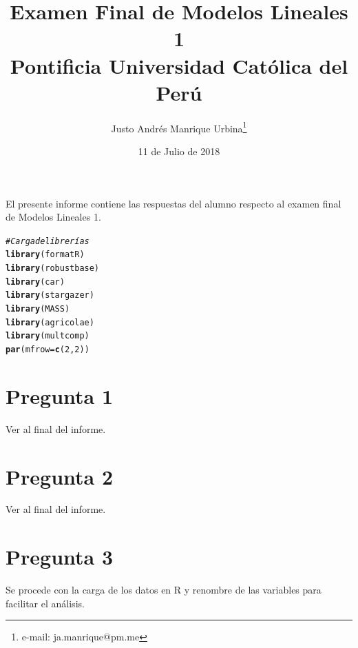 \documentclass[10pt,a4paper]{article}\usepackage[]{graphicx}\usepackage[]{color}
\title{%
			Examen Final de Modelos Lineales 1 \\
			\large Pontificia Universidad Católica del Perú}
\date{11 de Julio de 2018}
\author{Justo Andrés Manrique Urbina\footnote{e-mail: ja.manrique@pm.me}}
\makeatletter
\newcommand{\hlnum}[1]{\textcolor[rgb]{0.686,0.059,0.569}{#1}}%
\newcommand{\hlcom}[1]{\textcolor[rgb]{0.678,0.584,0.686}{\textit{#1}}}%
\newcommand{\hlstd}[1]{\textcolor[rgb]{0.345,0.345,0.345}{#1}}%
\newcommand{\hlkwc}[1]{\textcolor[rgb]{0.333,0.667,0.333}{#1}}%
\newcommand{\hlkwd}[1]{\textcolor[rgb]{0.737,0.353,0.396}{\textbf{#1}}}%
\newenvironment{kframe}{%
 \def\at@end@of@kframe{}%
 \ifinner\ifhmode%
  \def\at@end@of@kframe{\end{minipage}}%
  \begin{minipage}{\columnwidth}%
 \fi\fi%
 \def\FrameCommand##1{\hskip\@totalleftmargin \hskip-\fboxsep
 \colorbox{shadecolor}{##1}\hskip-\fboxsep
     \hskip-\linewidth \hskip-\@totalleftmargin \hskip\columnwidth}%
 \MakeFramed {\advance\hsize-\width
   \@totalleftmargin\z@ \linewidth\hsize
   \@setminipage}}%
 {\par\unskip\endMakeFramed%
 \at@end@of@kframe}
\newenvironment{knitrout}{}{} %
\makeatother
\begin{document}
\maketitle

El presente informe contiene las respuestas del alumno respecto al examen final de Modelos Lineales 1.

\begin{knitrout}\small
{}\color{fgcolor}\begin{kframe}
\begin{alltt}
\hlcom{# Carga de librerías}
\hlkwd{library}\hlstd{(formatR)}
\hlkwd{library}\hlstd{(robustbase)}
\hlkwd{library}\hlstd{(car)}
\hlkwd{library}\hlstd{(stargazer)}
\hlkwd{library}\hlstd{(MASS)}
\hlkwd{library}\hlstd{(agricolae)}
\hlkwd{library}\hlstd{(multcomp)}
\hlkwd{par}\hlstd{(}\hlkwc{mfrow}\hlstd{=}\hlkwd{c}\hlstd{(}\hlnum{2}\hlstd{,}\hlnum{2}\hlstd{))}
\end{alltt}
\end{kframe}
\end{knitrout}

\section{Pregunta 1}

Ver al final del informe.

\section{Pregunta 2}

Ver al final del informe.

\section{Pregunta 3}

Se procede con la carga de los datos en R y renombre de las variables para facilitar el análisis.
\end{document}
